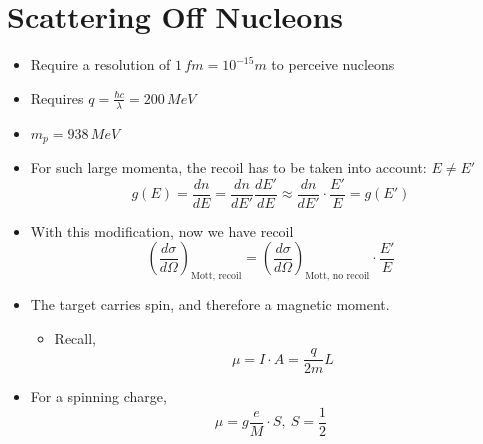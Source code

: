 \documentclass[a4paper, 11pt, normalem]{report}
\begin{document}
\section{Scattering Off Nucleons}
\begin{itemize}
    \item Require a resolution of $1\,fm = 10^{-15}m$ to perceive nucleons
    \item Requires $q = \frac{\hbar c}{\lambda} = 200\,MeV$
    \item $m_p = 938\,MeV$
    \item For such large momenta, the recoil has to be taken into account: $E \neq E'$
        \begin{equation}
            g(E) = \frac{dn}{dE} = \frac{dn}{dE'}\frac{dE'}{dE} \approx \frac{dn}{dE'}\cdot \frac{E'}{E} = g(E')
        \end{equation}
    \item With this modification, now we have recoil
        \begin{equation}
            \left(\frac{d\sigma}{d\Omega}\right)_{\text{Mott, recoil}} = \left(\frac{d\sigma}{d\Omega}\right)_{\text{Mott, no recoil}} \cdot \frac{E'}{E}
        \end{equation}
    \item The target carries spin, and therefore a magnetic moment. 
        \begin{itemize}
            \item Recall, 
                \begin{equation}
                    \mu = I\cdot A = \frac{q}{2m}L
                \end{equation}
        \end{itemize}
    \item For a spinning charge, 
        \begin{equation}
            \mu = g\frac{e}{M}\cdot S, ~S = \frac{1}{2}
        \end{equation}
\end{itemize}
\end{document}
